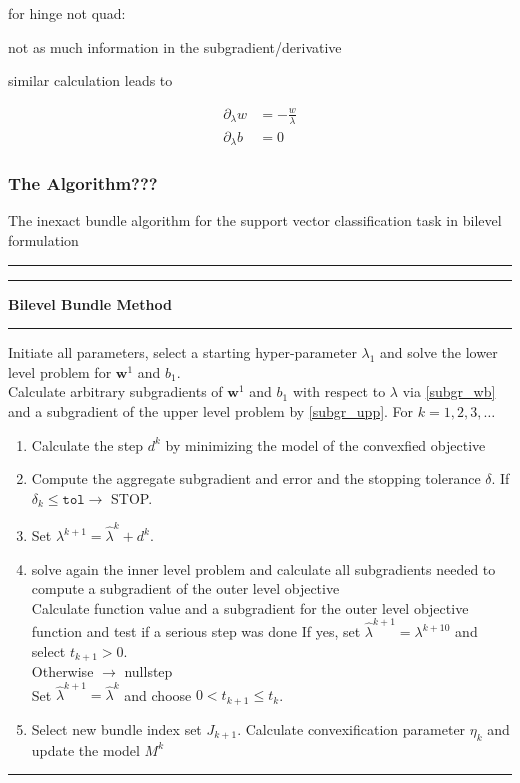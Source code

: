 for hinge not quad:

not as much information in the subgradient/derivative

similar calculation leads to 

\begin{align}
	\partial_{\lambda}w &= -\frac{w}{\lambda} \\
	\partial_{\lambda}b &= 0
\end{align}

\subsubsection{The Algorithm???}

The inexact bundle algorithm for the support vector classification task in bilevel formulation 
\vspace{1.5em}
\hrule  \vspace{0.4ex} \hrule
\vspace{1ex}
\textbf{Bilevel Bundle Method}
\vspace{1ex}
\hrule
\vspace{1ex}
Initiate all parameters, select a starting hyper-parameter \(\lambda_1\) and solve the lower level problem for \(\bm{w}^1\) and \(b_1\). \\
Calculate arbitrary subgradients of \(\bm{w}^1\) and \(b_1\) with respect to \(\lambda\) via \ref{subgr_wb} and a subgradient of the upper level problem by \ref{subgr_upp}.  
For \(k = 1,2,3,  \dotsc \)   

\begin{enumerate}
	\item Calculate the step \(d^k\) by minimizing the model of the convexfied objective
	\item Compute the aggregate subgradient and error and the stopping tolerance \(\delta\).
		If \(\delta_k \leq \mathtt{tol} \rightarrow \) STOP.
	\item Set \( \lambda^{k+1} = \hat{\lambda}^k + d^k \).
	\item solve again the inner level problem and calculate all subgradients needed to compute a subgradient of the outer level objective \\
	Calculate function value and a subgradient for the outer level objective function and test if a serious step was done 
	If yes, set \(\hat{\lambda}^{k+1} = \lambda^{k+10}\) and select \(t_{k+1} > 0\). \\
	Otherwise \(\rightarrow\) nullstep \\
	Set \(\hat{\lambda}^{k+1} = \hat{\lambda}^k\) and choose \(0 < t_{k+1} \leq t_k\). 	
	\item Select new bundle index set \(J_{k+1}\). Calculate convexification parameter \(\eta_k\)
	and update the model \(M^k\)
\end{enumerate}
\vspace{1ex}
\hrule
\vspace{1.5em}

